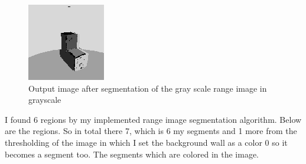 \documentclass{article}
\begin{document}
\begin{figure}[!htb]
    \centering
  		\includegraphics[scale=2.0]{outdeg_51_4bw.png}
  		\caption{Output image after segmentation of the gray scale range image in grayscale}
  		\label{Fig2}
\end{figure}
\newpage
I found 6 regions by my implemented range image segmentation algorithm. Below are the regions. So in total there 7, which is 6 my segments and 1 more from the thresholding of the image in which I set the background wall as a color 0 so it becomes a segment too. The segments which are colored in the image. 
\end{document}

